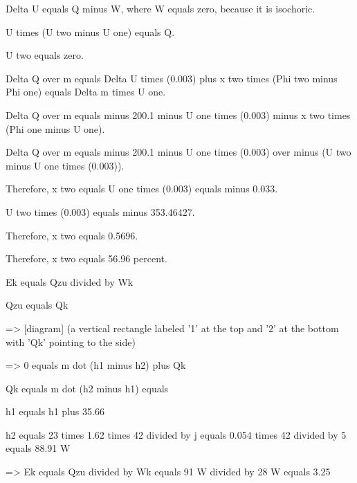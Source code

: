 Delta U equals Q minus W, where W equals zero, because it is isochoric.

U times (U two minus U one) equals Q.

U two equals zero.

Delta Q over m equals Delta U times (0.003) plus x two times (Phi two minus Phi one) equals Delta m times U one.

Delta Q over m equals minus 200.1 minus U one times (0.003) minus x two times (Phi one minus U one).

Delta Q over m equals minus 200.1 minus U one times (0.003) over minus (U two minus U one times (0.003)).

Therefore, x two equals U one times (0.003) equals minus 0.033.

U two times (0.003) equals minus 353.46427.

Therefore, x two equals 0.5696.

Therefore, x two equals 56.96 percent.

Ek equals Qzu divided by Wk

Qzu equals Qk

=> [diagram] (a vertical rectangle labeled '1' at the top and '2' at the bottom with 'Qk' pointing to the side)

=> 0 equals m dot (h1 minus h2) plus Qk

Qk equals m dot (h2 minus h1) equals

h1 equals h1 plus 35.66%

h2 equals 23 times 1.62 times 42 divided by j equals 0.054 times 42 divided by 5 equals 88.91 W

=> Ek equals Qzu divided by Wk equals 91 W divided by 28 W equals 3.25